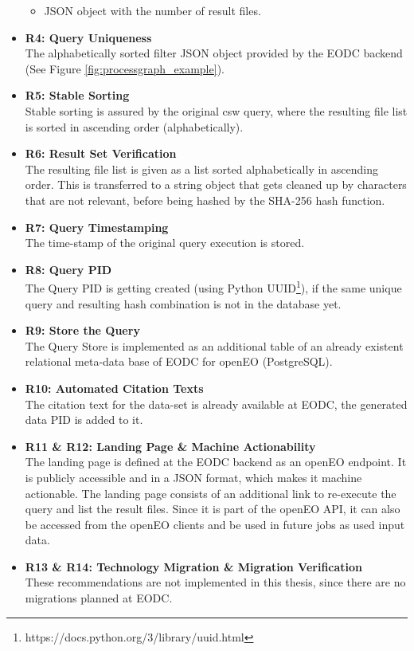 \documentclass[draft,final]{vutinfth} %
\begin{document}
\begin{itemize}
\begin{itemize}
		\item JSON object with the number of result files.
	\end{itemize}
	\item \textbf{R4: Query Uniqueness} \\
	The alphabetically sorted filter JSON object provided by the EODC backend (See Figure \ref{fig:processgraph_example}).
	\item \textbf{R5: Stable Sorting} \\
	Stable sorting is assured by the original \acrshort{csw} query, where the resulting file list is sorted in ascending order (alphabetically).
	\item \textbf{R6: Result Set Verification} \\
	The resulting file list is given as a list sorted alphabetically in ascending order. This is transferred to a string object that gets cleaned up by characters that are not relevant, before being hashed by the SHA-256 hash function. 
	\item \textbf{R7: Query Timestamping} \\
	The time-stamp of the original query execution is stored. 
	\item \textbf{R8: Query PID}\\
	The Query PID is getting created (using Python UUID\footnote{https://docs.python.org/3/library/uuid.html}), if the same unique query and resulting hash combination is not in the database yet.
	\item \textbf{R9: Store the Query} \\
	The Query Store is implemented as an additional table of an already existent relational meta-data base of EODC for openEO (PostgreSQL). 
	\item \textbf{R10: Automated Citation Texts} \\
	The citation text for the data-set is already available at EODC, the generated data PID is added to it. 
	\item \textbf{R11 \& R12: Landing Page \& Machine Actionability} \\
	The landing page is defined at the EODC backend as an openEO endpoint. It is publicly accessible and in a JSON format, which makes it machine actionable. The landing page consists of an additional link to re-execute the query and list the result files. Since it is part of the openEO API, it can also be accessed from the openEO clients and be used in future jobs as used input data.
	\item \textbf{R13 \& R14: Technology Migration \& Migration Verification} \\
	These recommendations are not implemented in this thesis, since there are no migrations planned at EODC.
\end{itemize}
\end{document}
